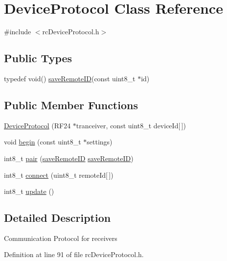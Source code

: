 \hypertarget{classDeviceProtocol}{}\section{Device\+Protocol Class Reference}
\label{classDeviceProtocol}


{\ttfamily \#include $<$rc\+Device\+Protocol.\+h$>$}

\subsection*{Public Types}
\begin{DoxyCompactItemize}
\item 
typedef void() \hyperlink{classDeviceProtocol_a1d33bbf35f5c6e7bb888eb06fc50c070}{save\+Remote\+ID}(const uint8\+\_\+t $\ast$id)
\end{DoxyCompactItemize}
\subsection*{Public Member Functions}
\begin{DoxyCompactItemize}
\item 
\hyperlink{classDeviceProtocol_aab81f811050405c0bc4b2c1e6b77f2b1}{Device\+Protocol} (R\+F24 $\ast$tranceiver, const uint8\+\_\+t device\+Id\mbox{[}$\,$\mbox{]})
\item 
void \hyperlink{classDeviceProtocol_aabea2ff004b2ae58be66ed675a0cf7b8}{begin} (const uint8\+\_\+t $\ast$settings)
\item 
int8\+\_\+t \hyperlink{classDeviceProtocol_aed6d598d72c46cfbc99cb9f8bcb301f7}{pair} (\hyperlink{classDeviceProtocol_a1d33bbf35f5c6e7bb888eb06fc50c070}{save\+Remote\+ID} \hyperlink{classDeviceProtocol_a1d33bbf35f5c6e7bb888eb06fc50c070}{save\+Remote\+ID})
\item 
int8\+\_\+t \hyperlink{classDeviceProtocol_a099b7b72a19262ab5ff19a41c9ce0a9e}{connect} (uint8\+\_\+t remote\+Id\mbox{[}$\,$\mbox{]})
\item 
int8\+\_\+t \hyperlink{classDeviceProtocol_ac08e4aca1a8265b1a3fe2182252ed812}{update} ()
\end{DoxyCompactItemize}


\subsection{Detailed Description}
Communication Protocol for receivers 

Definition at line 91 of file rc\+Device\+Protocol.\+h.



